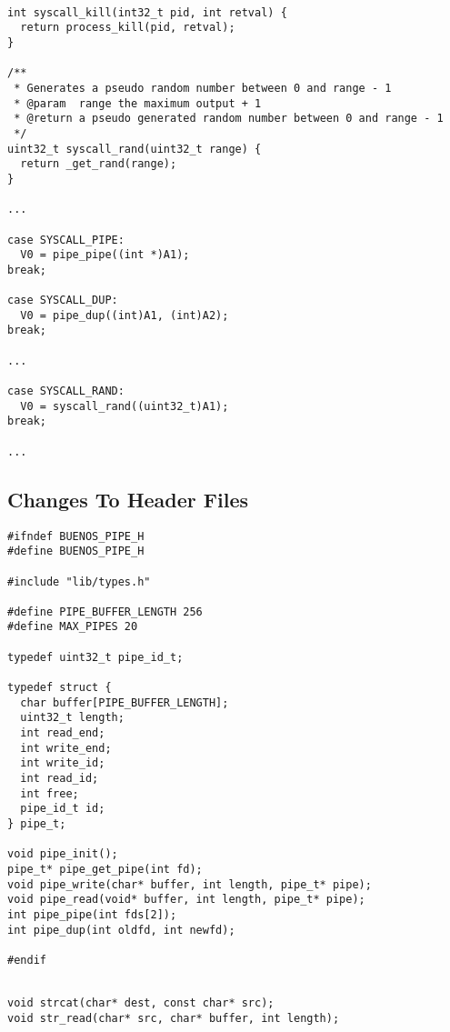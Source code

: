 \documentclass[12pt]{article}
\begin{document}
\begin{lstlisting}[caption=syscall.c]

int syscall_kill(int32_t pid, int retval) {
  return process_kill(pid, retval);
}

/**
 * Generates a pseudo random number between 0 and range - 1
 * @param  range the maximum output + 1
 * @return a pseudo generated random number between 0 and range - 1
 */
uint32_t syscall_rand(uint32_t range) {
  return _get_rand(range);
}

...

case SYSCALL_PIPE:
  V0 = pipe_pipe((int *)A1);
break;

case SYSCALL_DUP:
  V0 = pipe_dup((int)A1, (int)A2);
break;

...

case SYSCALL_RAND:
  V0 = syscall_rand((uint32_t)A1);
break;

...

\end{lstlisting}

\newpage 

\subsection{Changes To Header Files}

\begin{lstlisting}[caption=pipe.h]
#ifndef BUENOS_PIPE_H
#define BUENOS_PIPE_H

#include "lib/types.h"

#define PIPE_BUFFER_LENGTH 256
#define MAX_PIPES 20

typedef uint32_t pipe_id_t;

typedef struct {
  char buffer[PIPE_BUFFER_LENGTH];
  uint32_t length;
  int read_end;
  int write_end;
  int write_id;
  int read_id;
  int free;
  pipe_id_t id;
} pipe_t;

void pipe_init();
pipe_t* pipe_get_pipe(int fd);
void pipe_write(char* buffer, int length, pipe_t* pipe);
void pipe_read(void* buffer, int length, pipe_t* pipe);
int pipe_pipe(int fds[2]);
int pipe_dup(int oldfd, int newfd);

#endif

\end{lstlisting}

\begin{lstlisting}[caption=libc.h]

void strcat(char* dest, const char* src);
void str_read(char* src, char* buffer, int length);

\end{lstlisting}
\end{document}
